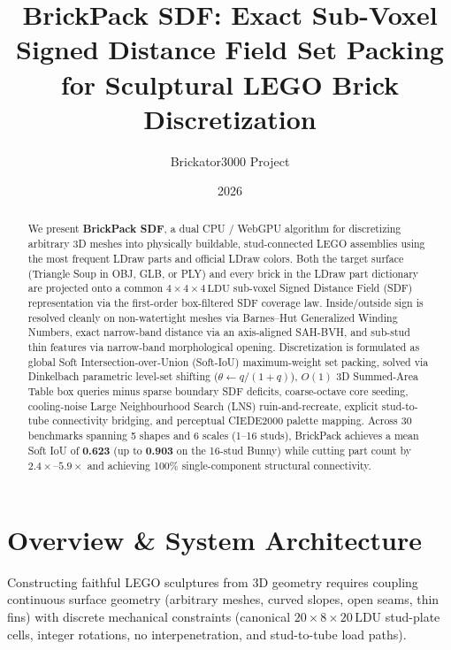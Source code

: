 \documentclass[11pt,twoside]{article}
\title{\textbf{BrickPack SDF}: Exact Sub-Voxel Signed Distance Field Set Packing\\for Sculptural LEGO Brick Discretization}
\author{Brickator3000 Project}
\date{2026}
\newcommand{\ldu}{\,\text{LDU}}
\begin{document}
\maketitle

\begin{abstract}
We present \textbf{BrickPack SDF}, a dual CPU / WebGPU algorithm for discretizing arbitrary 3D meshes into physically buildable, stud-connected LEGO assemblies using the most frequent LDraw parts and official LDraw colors. Both the target surface (Triangle Soup in OBJ, GLB, or PLY) and every brick in the LDraw part dictionary are projected onto a common $4\times 4\times 4\ldu$ sub-voxel Signed Distance Field (SDF) representation via the first-order box-filtered SDF coverage law. Inside/outside sign is resolved cleanly on non-watertight meshes via Barnes--Hut Generalized Winding Numbers, exact narrow-band distance via an axis-aligned SAH-BVH, and sub-stud thin features via narrow-band morphological opening. Discretization is formulated as global Soft Intersection-over-Union (Soft-IoU) maximum-weight set packing, solved via Dinkelbach parametric level-set shifting ($\theta \leftarrow q/(1+q)$), $O(1)$ 3D Summed-Area Table box queries minus sparse boundary SDF deficits, coarse-octave core seeding, cooling-noise Large Neighbourhood Search (LNS) ruin-and-recreate, explicit stud-to-tube connectivity bridging, and perceptual CIEDE2000 palette mapping. Across 30 benchmarks spanning 5 shapes and 6 scales (1--16 studs), BrickPack achieves a mean Soft IoU of \textbf{0.623} (up to \textbf{0.903} on the 16-stud Bunny) while cutting part count by $2.4\times$--$5.9\times$ and achieving 100\% single-component structural connectivity.
\end{abstract}

\section{Overview \& System Architecture}

Constructing faithful LEGO sculptures from 3D geometry requires coupling continuous surface geometry (arbitrary meshes, curved slopes, open seams, thin fins) with discrete mechanical constraints (canonical $20\times 8\times 20\ldu$ stud-plate cells, integer rotations, no interpenetration, and stud-to-tube load paths).
\end{document}
